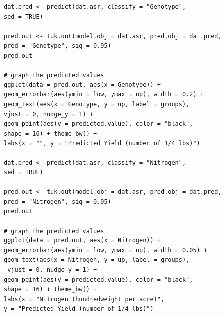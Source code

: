 \documentclass[a4paper, 10pt, fleqn, twosided]{memoir}
\begin{document}
\begin{tcolorbox}[title = Exercise 15 code]
\begin{verbatim}
dat.pred <- predict(dat.asr, classify = "Genotype",
sed = TRUE)

pred.out <- tuk.out(model.obj = dat.asr, pred.obj = dat.pred,
pred = "Genotype", sig = 0.95)
pred.out

# graph the predicted values 
ggplot(data = pred.out, aes(x = Genotype)) +
geom_errorbar(aes(ymin = low, ymax = up), width = 0.2) +
geom_text(aes(x = Genotype, y = up, label = groups),
vjust = 0, nudge_y = 1) +
geom_point(aes(y = predicted.value), color = "black",
shape = 16) + theme_bw() +
labs(x = "", y = "Predicted Yield (number of 1/4 lbs)")

dat.pred <- predict(dat.asr, classify = "Nitrogen",
sed = TRUE)

pred.out <- tuk.out(model.obj = dat.asr, pred.obj = dat.pred,
pred = "Nitrogen", sig = 0.95)
pred.out
 
# graph the predicted values 
ggplot(data = pred.out, aes(x = Nitrogen)) +
geom_errorbar(aes(ymin = low, ymax = up), width = 0.05) +
geom_text(aes(x = Nitrogen, y = up, label = groups),
 vjust = 0, nudge_y = 1) +
geom_point(aes(y = predicted.value), color = "black",
shape = 16) + theme_bw() +
labs(x = "Nitrogen (hundredweight per acre)",
y = "Predicted Yield (number of 1/4 lbs)")
\end{verbatim}
\end{tcolorbox}
\end{document}
